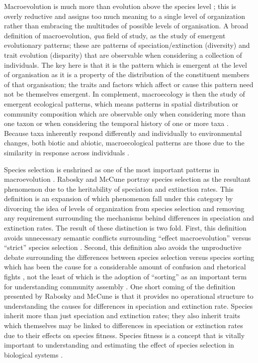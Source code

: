 Macroevolution is much more than evolution above the species level \citep{Foote2007b}; this is overly reductive and assigns too much meaning to a single level of organization rather than embracing the multitudes of possible levels of organisation. A broad definition of macroevolution, \textit{qua} field of study, as the study of emergent evolutionary patterns; these are patterns of speciation/extinction (diversity) and trait evolution (disparity) that are observable when considering a collection of individuals. The key here is that it is the pattern which is emergent at the level of organisation as it is a property of the distribution of the constituent members of that organisation; the traits and factors which affect or cause this pattern need not be themselves emergent. In complement, macroecology is then the study of emergent ecological patterns, which means patterns in spatial distribution or community composition which are observable only when considering more than one taxon or when considering the temporal history of one or more taxa \citep{Brown1989,Brown1995,Smith2008b}. Because taxa inherently respond differently and individually to environmental changes, both biotic and abiotic, macroecological patterns are those due to the similarity in response across individuals \citep{Blois2009}.

Species selection is enshrined as one of the most important patterns in macroevolution \citep{Stanley1975,Stanley1979,Vrba1986,Jablonski2008a,Rabosky2010b,Simpson2016a,Pennell2014}. Rabosky and McCune \citep{Rabosky2010b} portray species selection as the resultant phenomenon due to the heritability of speciation and extinction rates. This definition is an expansion of which phenomenon fall under this category by divorcing the idea of levels of organization from species selection and removing any requirement surrounding the mechanisms behind differences in speciation and extinction rates. The result of these distinction is two fold. First, this definition avoids unnecessary semantic conflicts surrounding ``effect macroevolution'' versus ``strict'' species selection \citep{Jablonski2007,Jablonski2008a,Vrba1984}. Second, this definition also avoids the unproductive debate surrounding the differences between species selection versus species sorting which has been the cause for a considerable amount of confusion and rhetorical fights \citep{Vrba1984a,Vrba1986,Lloyd1993,Pennell2014}, not the least of which is the adoption of ``sorting'' as an important term for understanding community assembly \citep{Urban2008,Loeuille2008,Holt2006,Cottenie2005,Soininen2014,VanderGucht2007,Shipley2006}. One short coming of the definition presented by Rabosky and McCune \citep{Rabosky2010b} is that it provides no operational structure to understanding the causes for differences in speciation and extinction rate. Species inherit more than just speciation and extinction rates; they also inherit traits which themselves may be linked to differences in speciation or extinction rates due to their effects on species fitness. Species fitness is a concept that is vitally important to understanding and estimating the effect of species selection in biological systems \citep{Cooper1984,Palmer2012}. 

